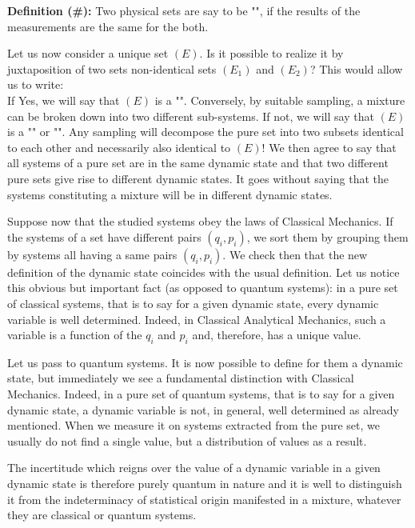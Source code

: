 	\textbf{Definition (\#\mydef):} Two physical sets are say to be "", if the results of the measurements are the same for the both.
	
	Let us now consider a unique set $(E)$. Is it possible to realize it by juxtaposition of two sets non-identical sets $(E_1)$ and $(E_2)$? This would allow us to write:
	\\
	If Yes, we will say that $(E)$ is a "". Conversely, by suitable sampling, a mixture can be broken down into two different sub-systems. If not, we will say that $(E)$ is a "" or "". Any sampling will decompose the pure set into two subsets identical to each other and necessarily also identical to $(E)$! We then agree to say that all systems of a pure set are in the same dynamic state and that two different pure sets give rise to different dynamic states. It goes without saying that the systems constituting a mixture will be in different dynamic states.
	
	Suppose now that the studied systems obey the laws of Classical Mechanics. If the systems of a set have different pairs $(q_i,p_i)$, we sort them by grouping them by systems all having a same pairs $(q_i,p_i)$. We check then that the new definition of the dynamic state coincides with the usual definition. Let us notice this obvious but important fact (as opposed to quantum systems): in a pure set of classical systems, that is to say for a given dynamic state, every dynamic variable is well determined. Indeed, in Classical Analytical Mechanics, such a variable is a function of the $q_i$ and $p_i$ and, therefore, has a unique value.
	
	Let us pass to quantum systems. It is now possible to define for them a dynamic state, but immediately we see a fundamental distinction with Classical Mechanics. Indeed, in a pure set of quantum systems, that is to say for a given dynamic state, a dynamic variable is not, in general, well determined as already mentioned. When we measure it on systems extracted from the pure set, we usually do not find a single value, but a distribution of values as a result.
	
	The incertitude which reigns over the value of a dynamic variable in a given dynamic state is therefore purely quantum in nature and it is well to distinguish it from the indeterminacy of statistical origin manifested in a mixture, whatever they are classical or quantum systems.
	
